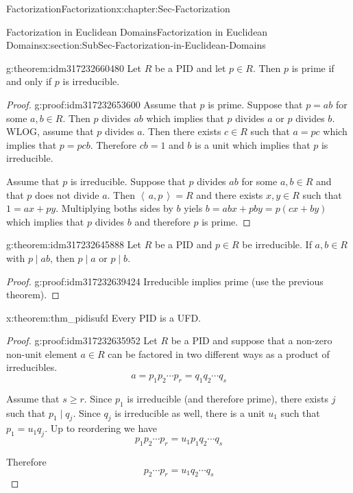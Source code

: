 \documentclass[oneside,10pt,]{book}
\numberwithin{equation}{section}
\renewcommand{\geq}{\geqslant}
\newcommand{\ideal}[1]{\left\langle\, #1 \,\right\rangle}
\begin{document}
\begin{chapterptx}{Factorization}{}{Factorization}{}{}{x:chapter:Sec-Factorization}
\begin{sectionptx}{Factorization in Euclidean Domains}{}{Factorization in Euclidean Domains}{}{}{x:section:SubSec-Factorization-in-Euclidean-Domains}
\begin{theorem}{}{}{g:theorem:idm317232660480}
Let \(R\) be a PID and let \(p\in R\). Then \(p\) is prime if and only if \(p\) is irreducible.%
\end{theorem}
\begin{proof}{}{g:proof:idm317232653600}
Assume that \(p\) is prime. Suppose that \(p=ab\) for some \(a,b \in R\). Then \(p\) divides \(ab\) which implies that \(p\) divides \(a\) or \(p\) divides \(b\). WLOG, assume that \(p\) divides \(a\). Then there exists \(c\in R\) such that \(a=pc\) which implies that \(p=pcb\). Therefore \(cb=1\) and \(b\) is a unit which implies that \(p\) is irreducible.%
\par
Assume that \(p\) is irreducible. Suppose that \(p\) divides \(ab\) for some \(a,b \in R\) and that \(p\) does not divide \(a\). Then \(\ideal{a,p}=R\) and there exists \(x,y\in R\) such that \(1=ax+py\). Multiplying boths sides by \(b\) yiels \(b=abx+pby=p(cx+by)\) which implies that \(p\) divides \(b\) and therefore \(p\) is prime.%
\end{proof}
\begin{theorem}{}{}{g:theorem:idm317232645888}%
Let \(R\) be a PID and \(p\in R\) be irreducible. If \(a,b\in R\) with \(p\mid ab\), then \(p\mid a\) or \(p\mid b\).%
\end{theorem}
\begin{proof}{}{g:proof:idm317232639424}
Irreducible implies prime (use the previous theorem).%
\end{proof}
\begin{theorem}{}{}{x:theorem:thm_pidisufd}%
Every PID is a UFD.%
\end{theorem}
\begin{proof}{}{g:proof:idm317232635952}
Let \(R\) be a PID and suppose that a non-zero non-unit element \(a\in R\) can be factored in two different ways as a product of irreducibles.%
\begin{equation*}
a=p_1p_2\cdots p_r=q_1q_2\cdots q_s
\end{equation*}
%
\par
Assume that \(s\geq r\). Since \(p_1\) is irreducible (and therefore prime), there exists \(j\) such that \(p_1 \mid q_j\). Since \(q_j\) is irreducible as well, there is a unit \(u_1\) such that \(p_1=u_1 q_j\). Up to reordering we have%
\begin{equation*}
p_1p_2\cdots p_r=u_1p_1q_2\cdots q_s
\end{equation*}
%
\par
Therefore%
\begin{equation*}
p_2\cdots p_r=u_1q_2\cdots q_s
\end{equation*}

\end{proof}
\end{sectionptx}
\end{chapterptx}
\end{document}
